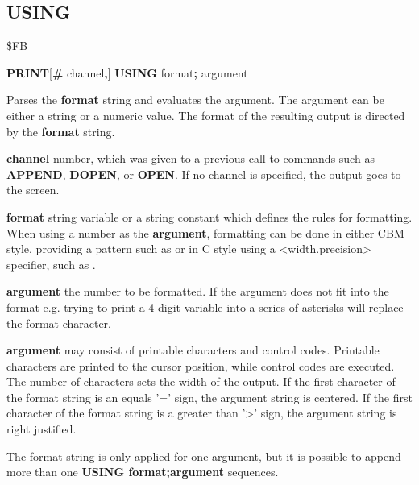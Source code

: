 \subsection{USING}
\begin{description}[leftmargin=2cm,style=nextline]
\item [Token:] \$FB
\item [Format:] {\bf PRINT}[{\bf\#} channel{\bf,}] {\bf USING} format{\bf;} argument
\item [Usage:]  Parses the {\bf format} string and evaluates the argument.
                The argument can be either a string or a numeric value.
                The format of the resulting output is directed
                by the {\bf format} string.

                {\bf channel} number, which was given to a previous
                call to commands such as {\bf APPEND}, {\bf DOPEN}, or {\bf OPEN}.
                If no channel is specified, the output goes to the screen.

                {\bf format} string variable or a string constant
                which defines the rules for formatting.
                When using a number as the {\bf argument}, formatting can be done in either
                CBM style, providing a pattern such as  
                or in C style using a <width.precision> specifier, such as .

                {\bf argument} the number to be formatted. If the argument does not fit into the format
                e.g. trying to print a 4 digit variable into \screentext{\#\#\#}
                a series of asterisks will replace the format character.

                {\bf argument} may consist of printable
                characters and control codes. Printable characters
                are printed to the cursor position, while control
                codes are executed.
                The number of \screentext{\#} characters sets the width of the output.
                If the first character of the format string
                is an equals '=' sign, the argument string is centered.
                If the first character of the format string
                is a greater than '>' sign, the argument string is right justified.

\item [Remarks:] The format string is only applied for one argument,
                 but it is possible to append more than one
                 {\bf USING format;argument} sequences.



\end{description}
